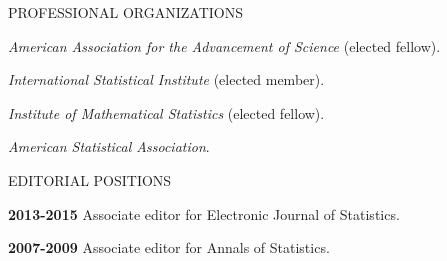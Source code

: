 \lsp
\begin{mylist} {PROFESSIONAL ORGANIZATIONS}
\item {\it American Association for the Advancement of Science} (elected fellow). 
\item {\it International Statistical Institute} (elected member).
\item {\it Institute of Mathematical Statistics} (elected fellow).
\item {\it American Statistical Association}.
\end{mylist}

\lsp
\begin{mylist}{EDITORIAL POSITIONS}
\item{\bf 2013-2015} Associate editor for Electronic Journal of Statistics.

\item{\bf 2007-2009} Associate editor for Annals of Statistics.

\end{mylist}

\lsp


